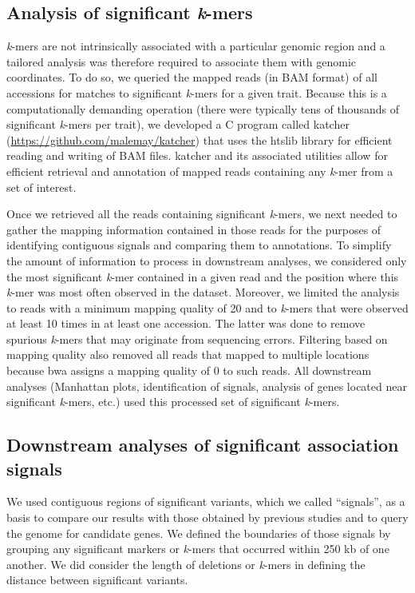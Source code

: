 \documentclass{article}
\begin{document}
\subsection*{Analysis of significant \emph{k}-mers}

\emph{k}-mers are not intrinsically associated with a particular genomic region
and a tailored analysis was therefore required to associate them with genomic
coordinates. To do so, we queried the mapped reads (in BAM format) of all accessions for matches
to significant \emph{k}-mers for a given trait. Because this is a
computationally demanding operation (there were typically tens of thousands of
significant \emph{k}-mers per trait), we developed a C program called katcher
(\url{https://github.com/malemay/katcher}) that
uses the htslib library  for efficient reading and
writing of BAM files. katcher and its associated utilities allow for efficient
retrieval and annotation of mapped reads containing any \emph{k}-mer from a set
of interest.

Once we retrieved all the reads containing significant \emph{k}-mers, we next
needed to gather the mapping information contained in those reads for the
purposes of identifying contiguous signals and comparing them to annotations. To
simplify the amount of information to process in downstream analyses, we
considered only the most significant \emph{k}-mer contained in a given read and
the position where this \emph{k}-mer was most often observed in
the dataset. Moreover, we limited the analysis to reads with a minimum mapping
quality of 20 and to \emph{k}-mers that were observed at least 10 times in at
least one accession. The latter was done to remove spurious \emph{k}-mers that may originate
from sequencing errors. Filtering based on mapping quality also removed all reads that
mapped to multiple locations because bwa assigns a mapping quality of 0 to such reads.
All downstream analyses (Manhattan plots,
identification of signals, analysis of genes located near significant
\emph{k}-mers, etc.) used this processed set of significant \emph{k}-mers.

\subsection*{Downstream analyses of significant association signals}

We used contiguous regions of significant variants, which we called
``signals'', as a basis to compare our results with those obtained by previous
studies and to query the genome for candidate genes. We defined the boundaries
of those signals by grouping any significant markers or \emph{k}-mers that
occurred within 250 kb of one another.  We did consider the length of deletions
or \emph{k}-mers in defining the distance between significant variants.
\end{document}
